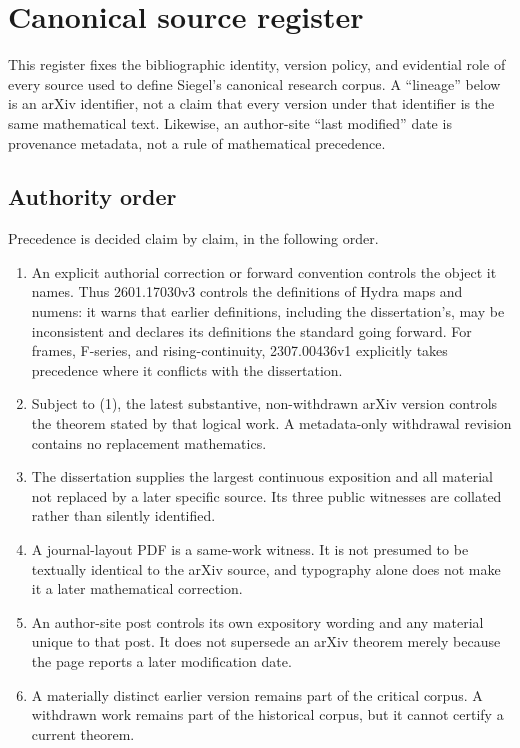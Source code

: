 \section{Canonical source register}
\label{sec:source-register}

This register fixes the bibliographic identity, version policy, and evidential
role of every source used to define Siegel's canonical research corpus.  A
``lineage'' below is an arXiv identifier, not a claim that every version under
that identifier is the same mathematical text.  Likewise, an author-site
``last modified'' date is provenance metadata, not a rule of mathematical
precedence.

\subsection{Authority order}

Precedence is decided claim by claim, in the following order.

\begin{enumerate}[label=\textup{(\arabic*)}]
\item An explicit authorial correction or forward convention controls the
      object it names.  Thus 2601.17030v3 controls the definitions of Hydra
      maps and numens: it warns that earlier definitions, including the
      dissertation's, may be inconsistent and declares its definitions the
      standard going forward.  For frames, F-series, and rising-continuity,
      2307.00436v1 explicitly takes precedence where it conflicts with the
      dissertation.
\item Subject to (1), the latest substantive, non-withdrawn arXiv version
      controls the theorem stated by that logical work.  A metadata-only
      withdrawal revision contains no replacement mathematics.
\item The dissertation supplies the largest continuous exposition and all
      material not replaced by a later specific source.  Its three public
      witnesses are collated rather than silently identified.
\item A journal-layout PDF is a same-work witness.  It is not presumed to be
      textually identical to the arXiv source, and typography alone does not
      make it a later mathematical correction.
\item An author-site post controls its own expository wording and any material
      unique to that post.  It does not supersede an arXiv theorem merely
      because the page reports a later modification date.
\item A materially distinct earlier version remains part of the critical
      corpus.  A withdrawn work remains part of the historical corpus, but it
      cannot certify a current theorem.
\end{enumerate}

